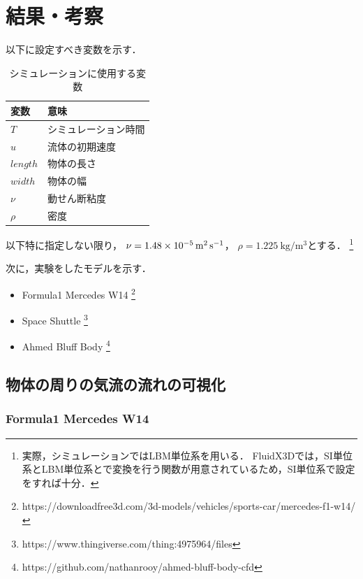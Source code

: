 \documentclass[main]{subfiles}
\begin{document}
\chapter{結果・考察}

以下に設定すべき変数を示す．
\begin{table}[ht]
    \centering
    \caption{シミュレーションに使用する変数}
    \begin{tabular}{ll}
        \toprule
        変数       & 意味         \\
        \midrule
        $T$      & シミュレーション時間 \\
        $u$      & 流体の初期速度    \\
        $length$ & 物体の長さ      \\
        $width$  & 物体の幅       \\
        $\nu$    & 動せん断粘度     \\
        $\rho$   & 密度         \\
        \bottomrule
    \end{tabular}%
    \label{tab:result-variables}%
\end{table}

以下特に指定しない限り，
$\nu=\SI{1.48E-5}{\square\meter\per\second}$，
$\rho=\SI{1.225}{\kilogram\per\cubic\meter}$とする．
\footnote{
    実際，シミュレーションではLBM単位系を用いる．
    FluidX3Dでは，SI単位系とLBM単位系とで変換を行う関数が用意されているため，SI単位系で設定をすれば十分．
}

次に，実験をしたモデルを示す．

\begin{itemize}
    \item Formula1 Mercedes W14 \footnote{https://downloadfree3d.com/3d-models/vehicles/sports-car/mercedes-f1-w14/}
    \item Space Shuttle \footnote{https://www.thingiverse.com/thing:4975964/files}
    \item Ahmed Bluff Body \footnote{https://github.com/nathanrooy/ahmed-bluff-body-cfd}
\end{itemize}

\clearpage
\section{物体の周りの気流の流れの可視化}
\subsection{Formula1 Mercedes W14}

\end{document}
